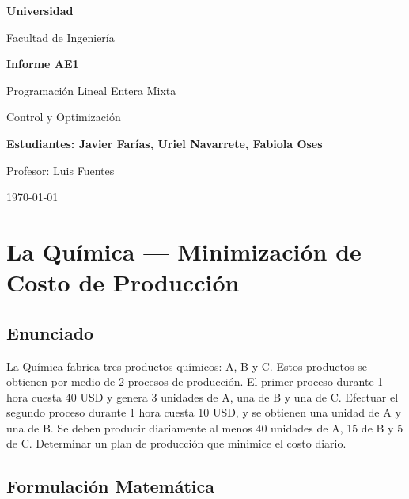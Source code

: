\documentclass[12pt,a4paper]{article}
\begin{document}
\begin{titlepage}
\centering
\vspace*{3cm}
{\LARGE\bfseries Universidad \par}
\vspace{0.5cm}
{\Large Facultad de Ingeniería \par}
\vspace{2cm}
{\Huge\bfseries Informe AE1 \par}
\vspace{0.5cm}
{\LARGE Programación Lineal Entera Mixta \par}
\vspace{0.3cm}
{\Large Control y Optimización \par}
\vspace{3cm}
{\Large\bfseries Estudiantes: Javier Farías, Uriel Navarrete, Fabiola Oses  \par}
\vspace{0.5cm}
{\Large Profesor: Luis Fuentes \par}
\vspace{2cm}
{\large \today \par}
\end{titlepage}

\tableofcontents
\newpage

\section{La Química --- Minimización de Costo de Producción}

\subsection{Enunciado}

La Química fabrica tres productos químicos: A, B y C. Estos productos se obtienen por medio de 2 procesos de producción. El primer proceso durante 1 hora cuesta 40 USD y genera 3 unidades de A, una de B y una de C. Efectuar el segundo proceso durante 1 hora cuesta 10 USD, y se obtienen una unidad de A y una de B. Se deben producir diariamente al menos 40 unidades de A, 15 de B y 5 de C. Determinar un plan de producción que minimice el costo diario.

\subsection{Formulación Matemática}
\end{document}
